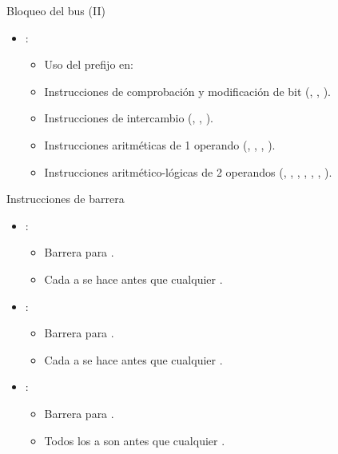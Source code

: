 \begin{frame}[t]{Bloqueo del bus (II)}
\begin{itemize}
  \item {}:
    \begin{itemize}
      \item Uso del prefijo  en:
      \item Instrucciones de comprobación y modificación de bit (, , ).
      \item Instrucciones de intercambio (, , ).
      \item Instrucciones aritméticas de 1 operando (, , , ).
      \item Instrucciones aritmético-lógicas de 2 operandos (, , , 
            , , , ).
    \end{itemize}
\end{itemize}
\end{frame}

\begin{frame}[t]{Instrucciones de barrera}
\begin{itemize}
  \item {}:
    \begin{itemize}
      \item Barrera para .
      \item Cada  a  
            se hace  antes que cualquier .
    \end{itemize}

  \item {}:
    \begin{itemize}
      \item Barrera para .
      \item Cada  a  se hace  
            antes que cualquier .
    \end{itemize}

  \item {}:
    \begin{itemize}
      \item Barrera para .
      \item Todos los  a  son  
            antes que cualquier .
    \end{itemize}
\end{itemize}
\end{frame}

